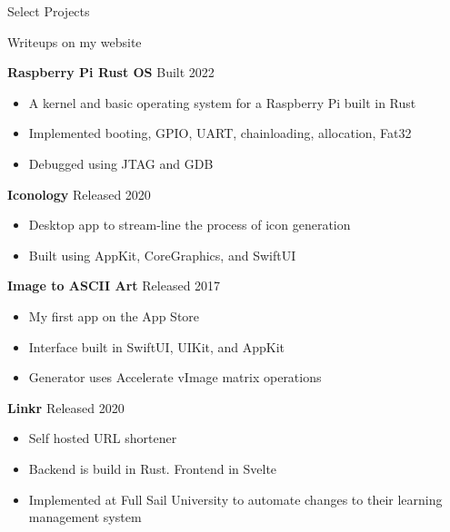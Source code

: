\documentclass{resume}
\newif\ifisDigital
\begin{document}
\begin{rSection}{Select Projects}

\ifisDigital
\vspace{-1.25em}
\else
Writeups on my website
\fi

\item \textbf{Raspberry Pi Rust OS} {Built 2022} 
\begin{itemize}
    \itemsep -3pt {}
    \vspace{-0.35em}
    \item A kernel and basic operating system for a Raspberry Pi built in Rust
    \item Implemented booting, GPIO, UART, chainloading, allocation, Fat32
    \item Debugged using JTAG and GDB
\end{itemize}

\item \textbf{Iconology} {Released 2020} 
\ifisDigital\hfill\href{https://liamrosenfeld.com/projects/iconology}{Writeup}\fi
\begin{itemize}
    \itemsep -3pt {}
    \vspace{-0.35em}
    \item Desktop app to stream-line the process of icon generation
    \item Built using AppKit, CoreGraphics, and SwiftUI
\end{itemize}

\item \textbf{Image to ASCII Art} {Released 2017}
\ifisDigital\hfill \href{https://liamrosenfeld.com/projects/ascii-art/}{Writeup}\fi
\begin{itemize}
    \itemsep -3pt {} 
    \vspace{-0.35em}
    \item My first app on the App Store
    \item Interface built in SwiftUI, UIKit, and AppKit
    \item Generator uses Accelerate vImage matrix operations
\end{itemize}

\item \textbf{Linkr} {Released 2020}
\ifisDigital\hfill \href{https://liamrosenfeld.com/projects/linkr/}{Writeup}\fi
\begin{itemize}
    \itemsep -3pt {} 
    \vspace{-0.35em}
    \item Self hosted URL shortener
    \item Backend is build in Rust. Frontend in Svelte
    \item Implemented at Full Sail University to automate changes to their learning management system
\end{itemize}


\end{rSection}
\end{document}

